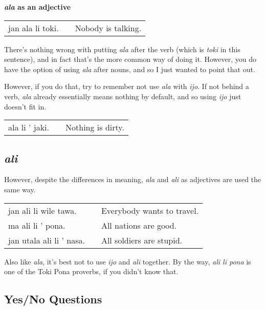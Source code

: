 \textbf{\textit{ala} as an adjective}

\begin{supertabular}{p{5,5cm}|ll}
jan ala li toki. && Nobody is talking. \\
\end{supertabular} 

There's nothing wrong with putting \textit{ala} after the verb (which is \textit{toki} in this sentence), and in fact that's the more common way of doing it. 
However, you do have the option of using \textit{ala} after nouns, and so I just wanted to point that out. 

However, if you do that, try to remember not use \textit{ala} with \textit{ijo}. 
If not behind a verb, \textit{ala} already essentially means nothing by default, and so using \textit{ijo} just doesn't fit in.

\begin{supertabular}{p{5,5cm}|ll}
ala li ' jaki. && Nothing is dirty. \\
\end{supertabular} 
%
\subsection*{\textit{ali}}
%
However, despite the differences in meaning, \textit{ala} and \textit{ali} as adjectives are used the same way.

\begin{supertabular}{p{5,5cm}|ll}
jan ali li wile tawa. && Everybody wants to travel. \\
ma ali li ' pona. && All nations are good. \\
jan utala ali li ' nasa. && All soldiers are stupid.
\end{supertabular} 

Also like \textit{ala}, it's best not to use \textit{ijo} and \textit{ali} together. 
By the way, \textit{ali li pona} is one of the Toki Pona proverbs, if you didn't know that.  
%
\newpage
{}
\subsection*{Yes/No Questions}

